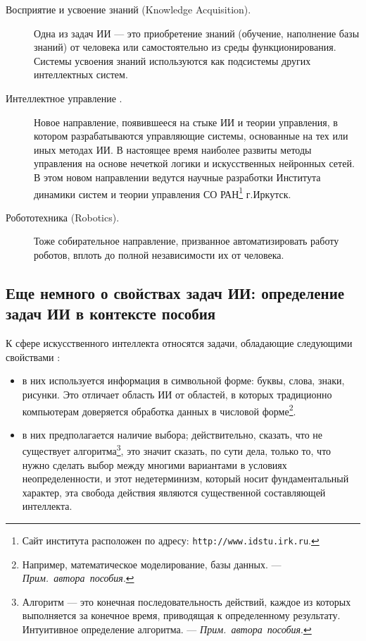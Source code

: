 \documentclass[12pt, openany, twoside]{book} %
\def\AR{{\em Прим.~автора~пособия}}
\begin{document}
\begin{description}
 \item [Восприятие и усвоение знаний (Knowledge Acquisition).] Одна из задач ИИ --- это приобретение знаний (обучение, наполнение базы знаний) от человека или самостоятельно из среды функционирования. Системы усвоения знаний используются как подсистемы других интеллектных систем.
 \item [Интеллектное управление \cite{Vass:2000}.] Новое направление, появившееся на стыке ИИ и теории управления, в котором разрабатываются управляющие системы, основанные на тех или иных методах ИИ. В настоящее время наиболее развиты методы управления на основе нечеткой логики и искусственных нейронных сетей. В этом новом направлении ведутся научные разработки Института динамики систем и теории управления СО РАН\footnote{Сайт института расположен по адресу: {\tt http://www.idstu.irk.ru}.} г.Иркутск.
\item [Робототехника (Robotics).] Тоже собирательное направление, призванное авто\-ма\-ти\-зировать работу роботов, вплоть до полной независимости их от человека.
\end{description}

\subsection{Еще немного о свойствах задач ИИ: определение задач ИИ в контексте пособия}

К сфере искусственного интеллекта относятся задачи, обладающие следующими свойствами \cite{Lauriere}:
 \begin{itemize}
 \item в них используется информация в символьной форме: буквы, слова, знаки, рисунки. Это отличает область ИИ от областей, в которых традиционно компьютерам доверяется обработка данных в числовой форме\footnote{Например, математическое моделирование, базы данных. --- \AR.}.
  \item в них предполагается наличие выбора; действительно, сказать, что не существует алгоритма\footnote{Алгоритм --- это конечная последовательность действий, каждое из которых выполняется за конечное время, приводящая к определенному результату. Интуитивное определение алгоритма. --- \AR.}, это значит сказать, по сути дела, только то, что нужно сделать выбор между многими вариантами в условиях неопределенности, и этот недетерминизм, который носит фундаментальный характер, эта свобода действия являются существенной составляющей интеллекта.
 \end{itemize}
\end{document}
